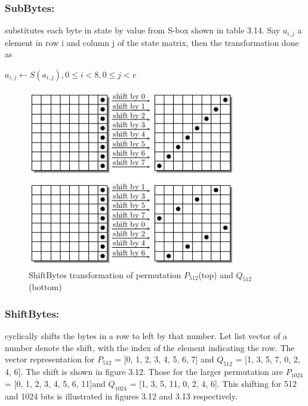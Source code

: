   \subsubsection{SubBytes:} substitutes each byte in state by value from S-box shown in table 3.14.
  Say $a_{i,j}$ a element in row i and column j of the state matrix, then the transformation done as 
  \begin{center}$a_{i,j} \gets S( a_{i,j}),  0 \leq i < 8, 0 \leq j < v$ \end{center}
  
  \begin{figure}
    \begin{center}
      \includegraphics[width=3.6in]{groestl512shift.jpg}
    \end{center}
    \caption{ShiftBytes transformation of permutation $P_{512}$(top) and $Q_{512}$(bottom) \cite{00019}}
    \label{fig:lab}
  \end{figure}

  \subsubsection{ShiftBytes:} cyclically shifts the bytes in a row to left by that number. Let list 
  vector of a number denote the shift, with the index of the element indicating the row. The vector representation
  for $P_{512}$ = [0, 1, 2, 3, 4, 5, 6, 7] and $Q_{512}$ = [1, 3, 5, 7, 0, 2, 4, 6]. The shift is shown in figure
  3.12. Those for the larger permutation are $P_{1024}$ = [0, 1, 2, 3, 4, 5, 6, 11]and $Q_{1024}$ = 
  [1, 3, 5, 11, 0, 2, 4, 6]. This shifting for 512 and 1024 bits is illustrated in figures 3.12 and 3.13 respectively.
    
